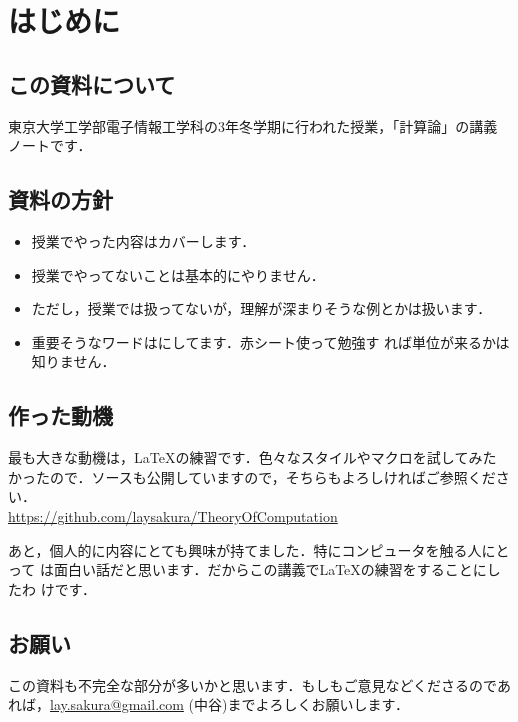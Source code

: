 
\chapter{はじめに}

\section{この資料について}
東京大学工学部電子情報工学科の3年冬学期に行われた授業，「計算論」の講義
ノートです．

\section{資料の方針}
\begin{itemize}
 \item 授業でやった内容はカバーします．
 \item 授業でやってないことは基本的にやりません．
 \item ただし，授業では扱ってないが，理解が深まりそうな例とかは扱います．
 \item 重要そうなワードはにしてます．赤シート使って勉強す
       れば単位が来るかは知りません．
\end{itemize}

\section{作った動機}
最も大きな動機は，\LaTeX の練習です．色々なスタイルやマクロを試してみた
かったので．ソースも公開していますので，そちらもよろしければご参照くださ
い．\\
\url{https://github.com/laysakura/TheoryOfComputation}

あと，個人的に内容にとても興味が持てました．特にコンピュータを触る人にとって
は面白い話だと思います．だからこの講義で\LaTeX の練習をすることにしたわ
けです．

\section{お願い}
この資料も不完全な部分が多いかと思います．もしもご意見などくださるのであ
れば，\url{lay.sakura@gmail.com} (中谷)までよろしくお願いします．
